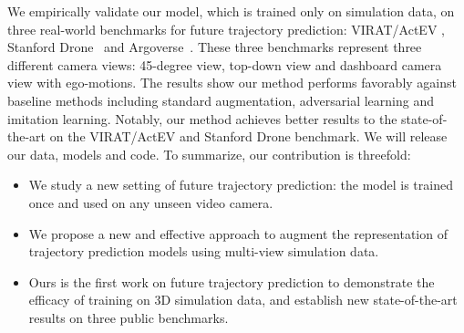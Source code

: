 \documentclass[runningheads]{eccv2020/llncs}
\begin{document}
We empirically validate our model, which is trained only on simulation data, 
on three real-world benchmarks for future trajectory prediction: VIRAT/ActEV \cite{oh2011large,2018trecvidawad}, Stanford Drone~\cite{robicquet2016learning} and Argoverse~\cite{chang2019argoverse}. 
These three benchmarks represent three different camera views: 45-degree view, top-down view and dashboard camera view with ego-motions.
The results show our method performs favorably against baseline methods including standard augmentation, adversarial learning and imitation learning. 
Notably, our method achieves better results to the state-of-the-art on the VIRAT/ActEV and Stanford Drone benchmark. 
We will release our data, models and code. To summarize, our contribution is threefold:
\begin{itemize}
    \item We study a new setting of future trajectory prediction: the model is trained once and used on any unseen video camera.
    \item We propose a new and effective approach to augment the representation of trajectory prediction models using multi-view simulation data.
    \item Ours is the first work on future trajectory prediction to demonstrate the efficacy of training on 3D simulation data, and establish new state-of-the-art results on three public benchmarks.
\end{itemize}













 
\end{document}

